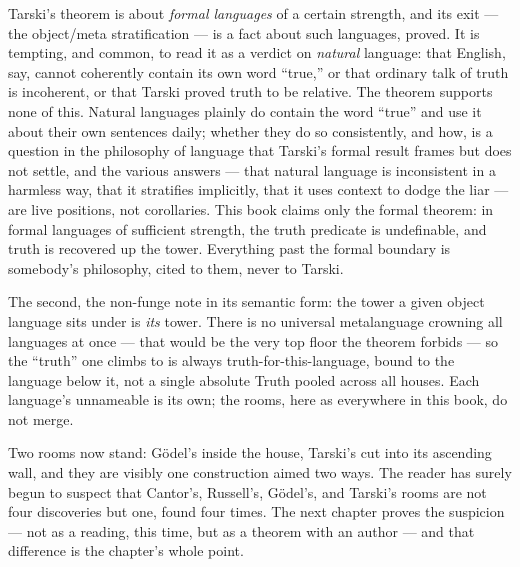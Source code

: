 Tarski's theorem is about \emph{formal languages} of a certain strength,
and its exit --- the object/meta stratification --- is a fact about such
languages, proved. It is tempting, and common, to read it as a verdict on
\emph{natural} language: that English, say, cannot coherently contain its
own word ``true,'' or that ordinary talk of truth is incoherent, or that
Tarski proved truth to be relative. The theorem supports none of this.
Natural languages plainly do contain the word ``true'' and use it about
their own sentences daily; whether they do so consistently, and how, is a
question in the philosophy of language that Tarski's formal result frames
but does not settle, and the various answers --- that natural language is
inconsistent in a harmless way, that it stratifies implicitly, that it
uses context to dodge the liar --- are live positions, not corollaries.
This book claims only the formal theorem: in formal languages of
sufficient strength, the truth predicate is undefinable, and truth is
recovered up the tower. Everything past the formal boundary is somebody's
philosophy, cited to them, never to Tarski.

The second, the non-funge note in its semantic form: the tower a given
object language sits under is \emph{its} tower. There is no universal
metalanguage crowning all languages at once --- that would be the very
top floor the theorem forbids --- so the ``truth'' one climbs to is always
truth-for-this-language, bound to the language below it, not a single
absolute Truth pooled across all houses. Each language's unnameable is its
own; the rooms, here as everywhere in this book, do not merge.

Two rooms now stand: G\"odel's inside the house, Tarski's cut into its
ascending wall, and they are visibly one construction aimed two ways. The
reader has surely begun to suspect that Cantor's, Russell's, G\"odel's,
and Tarski's rooms are not four discoveries but one, found four times. The
next chapter proves the suspicion --- not as a reading, this time, but as
a theorem with an author --- and that difference is the chapter's whole
point.
